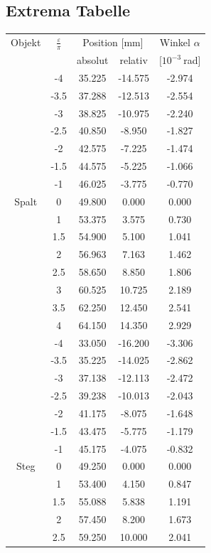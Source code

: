 \documentclass[12pt,a4paper,titlepage,headinclude,bibtotoc]{scrartcl}
\begin{document}
\subsection{Extrema Tabelle}
\begin{table}[!htb]
	\centering
	\begin{tabular}{|c||c|c|c|c|}
		\hline		
		Objekt & $\frac{\varepsilon}{\pi}$ & \multicolumn{2}{c}{Position [mm]} & Winkel $\alpha$ \\
		& & absolut & relativ & [$10^{-3}~$rad] \\
		\hline
		\hline
		&	-4	&	35.225	&	-14.575	&	-2.974	\\
		&	-3.5	&	37.288	&	-12.513	&	-2.554	\\
		&	-3	&	38.825	&	-10.975	&	-2.240	\\
		&	-2.5	&	40.850	&	-8.950	&	-1.827	\\
		&	-2	&	42.575	&	-7.225	&	-1.474	\\
		&	-1.5	&	44.575	&	-5.225	&	-1.066	\\
		&	-1	&	46.025	&	-3.775	&	-0.770	\\
		Spalt &	0	&	49.800	&	0.000	&	0.000	\\
		&	1	&	53.375	&	3.575	&	0.730	\\
		&	1.5	&	54.900	&	5.100	&	1.041	\\
		&	2	&	56.963	&	7.163	&	1.462	\\
		&	2.5	&	58.650	&	8.850	&	1.806	\\
		&	3	&	60.525	&	10.725	&	2.189	\\
		&	3.5	&	62.250	&	12.450	&	2.541	\\
		&	4	&	64.150	&	14.350	&	2.929	\\
		\hline
		&	-4	&	33.050	&	-16.200	&	-3.306	\\
		&	-3.5	&	35.225	&	-14.025	&	-2.862	\\
		&	-3	&	37.138	&	-12.113	&	-2.472	\\
		&	-2.5	&	39.238	&	-10.013	&	-2.043	\\
		&	-2	&	41.175	&	-8.075	&	-1.648	\\
		&	-1.5	&	43.475	&	-5.775	&	-1.179	\\
		&	-1	&	45.175	&	-4.075	&	-0.832	\\
		Steg &	0	&	49.250	&	0.000	&	0.000	\\
		&	1	&	53.400	&	4.150	&	0.847	\\
		&	1.5	&	55.088	&	5.838	&	1.191	\\
		&	2	&	57.450	&	8.200	&	1.673	\\
		&	2.5	&	59.250	&	10.000	&	2.041	\\

\end{tabular}
\end{table}
\end{document}
